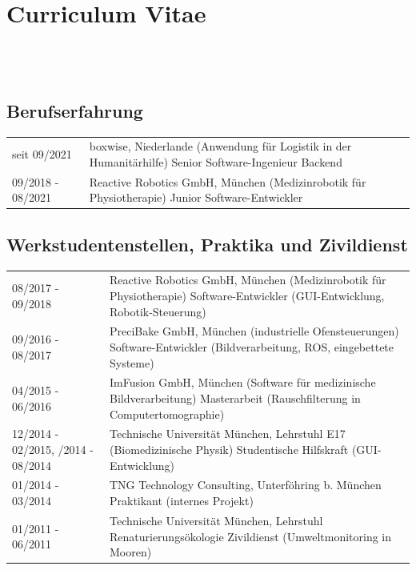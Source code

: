 \documentclass[a4paper,10pt]{memoir}
\begin{document}
\section*{\color{MidnightBlue} Curriculum Vitae}


\\
\\

\subsection*{Berufserfahrung}
\vspace*{-\baselineskip}
\begin{longtable}{@{}p{} p{}}
  seit 09/2021 &
  boxwise, Niederlande (Anwendung für Logistik in der Humanitärhilfe) \newline
  Senior Software-Ingenieur Backend
  \\
  09/2018 - 08/2021 &
  Reactive Robotics GmbH, München (Medizinrobotik für Physiotherapie) \newline
  Junior Software-Entwickler
\end{longtable}

\subsection*{Werkstudentenstellen, Praktika und Zivildienst}
\vspace*{-\baselineskip}
\begin{longtable}{@{}p{} p{}}
  08/2017 - 09/2018 &
  Reactive Robotics GmbH, München (Medizinrobotik für Physiotherapie) \newline
  Software-Entwickler (GUI-Entwicklung, Robotik-Steuerung)
  \\
  09/2016 - 08/2017 &
  PreciBake GmbH, München (industrielle Ofensteuerungen) \newline
  Software-Entwickler (Bildverarbeitung, ROS, eingebettete Systeme)
  \\
  04/2015 - 06/2016 &
  ImFusion GmbH, München (Software für medizinische Bildverarbeitung) \newline
  Masterarbeit (Rauschfilterung in Computertomographie)
  \\
  12/2014 - 02/2015, \newline
  06/2014 - 08/2014 &
  Technische Universität München, Lehrstuhl E17 (Biomedizinische Physik) \newline
  Studentische Hilfskraft (GUI-Entwicklung)
  \\
  01/2014 - 03/2014 &
  TNG Technology Consulting, Unterföhring b. München \newline
  Praktikant (internes Projekt)
  \\
  01/2011 - 06/2011 &
  Technische Universität München, Lehrstuhl Renaturierungsökologie \newline
  Zivildienst (Umweltmonitoring in Mooren)
\end{longtable}
\end{document}

